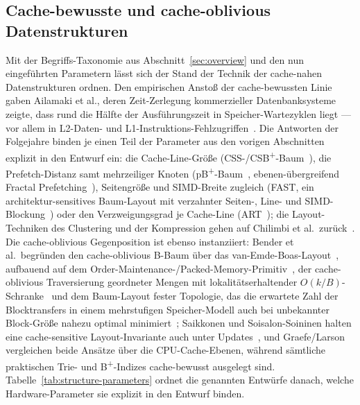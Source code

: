 \begin{nurlang}
\subsection{Cache-bewusste und cache-oblivious Datenstrukturen}\label{subsec:cc-structures}
Mit der Begriffs-Taxonomie aus Abschnitt~\ref{sec:overview} und den nun eingeführten Parametern
lässt sich der Stand der Technik der cache-nahen Datenstrukturen ordnen. Den empirischen Anstoß der
cache-bewussten Linie gaben Ailamaki et al., deren Zeit-Zerlegung kommerzieller Datenbanksysteme
zeigte, dass rund die Hälfte der Ausführungszeit in Speicher-Wartezyklen liegt --- vor allem in
L2-Daten- und L1-Instruktions-Fehlzugriffen~\cite{ailamaki1999dbms}. Die Antworten der Folgejahre
binden je einen Teil der Parameter aus den vorigen Abschnitten explizit in den Entwurf ein: die
Cache-Line-Größe (CSS-/CSB\textsuperscript{+}-Baum~\cite{rao1999css,rao2000csb}), die
Prefetch-Distanz samt mehrzeiliger Knoten (pB\textsuperscript{+}-Baum~\cite{chen2001prefetch},
ebenen-übergreifend Fractal Prefetching~\cite{chen2002fractal}), Seitengröße und SIMD-Breite
zugleich (FAST, ein architektur-sensitives Baum-Layout mit verzahnter Seiten-, Line- und
SIMD-Blockung~\cite{kim2010fast}) oder den Verzweigungsgrad je Cache-Line (ART~\cite{leis2013art});
die Layout-Techniken des Clustering und der Kompression gehen auf Chilimbi et al.\
zurück~\cite{chilimbi1999layout}. Die cache-oblivious Gegenposition ist ebenso instanziiert: Bender
et al.\ begründen den cache-oblivious B-Baum über das
van-Emde-Boas-Layout~\cite{bender2005coboblivious}, aufbauend auf dem
Order-Maintenance-/Packed-Memory-Primitiv~\cite{bender2002orderlist}, der cache-oblivious
Traversierung geordneter Mengen mit lokalitätserhaltender
$O(k/B)$-Schranke~\cite{bender2002scanning} und dem Baum-Layout fester Topologie, das die erwartete
Zahl der Blocktransfers in einem mehrstufigen Speicher-Modell auch bei unbekannter Block-Größe
nahezu optimal minimiert~\cite{bender2002treelayout,bender2000cobtree}; Saikkonen und
Soisalon-Soininen halten eine cache-sensitive Layout-Invariante auch unter
Updates~\cite{saikkonen2008multilevel,saikkonen2016layout}, und
Graefe/Larson~\cite{graefe2001btree} vergleichen beide Ansätze über die CPU-Cache-Ebenen, während
sämtliche praktischen Trie- und B\textsuperscript{+}-Indizes cache-bewusst ausgelegt sind.
Tabelle~\ref{tab:structure-parameters} ordnet die genannten Entwürfe danach, welche
Hardware-Parameter sie explizit in den Entwurf binden.


\end{nurlang}
